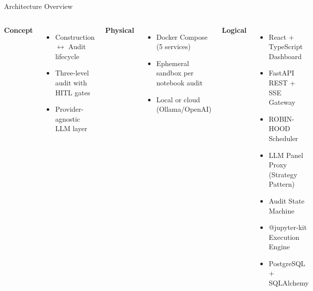 \documentclass[11pt, aspectratio=169]{beamer}
\begin{document}
\begin{frame}{Architecture Overview}
  \centering
  \vspace{-0.2cm}
  {\footnotesize
  \begin{columns}[T]
      \textbf{Concept}
      \begin{itemize}
        \item Construction $\leftrightarrow$ Audit lifecycle
        \item Three-level audit with HITL gates
        \item Provider-agnostic LLM layer
      \end{itemize}
      \vspace{0.3cm}
      \textbf{Physical}
      \begin{itemize}
        \item Docker Compose (5 services)
        \item Ephemeral sandbox per notebook audit
        \item Local or cloud (Ollama/OpenAI)
      \end{itemize}

      \textbf{Logical}
      \begin{itemize}
        \item React + TypeScript Dashboard
        \item FastAPI REST + SSE Gateway
        \item \alert{ROBIN-HOOD Scheduler}
        \item \alert{LLM Panel Proxy} (Strategy Pattern)
        \item Audit State Machine
        \item @jupyter-kit Execution Engine
        \item PostgreSQL + SQLAlchemy
      \end{itemize}
  \end{columns}
  }
\end{frame}
\end{document}
